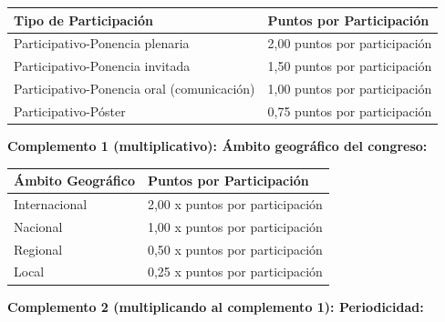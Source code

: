 \documentclass{article}
\begin{document}
\begin{itemize}
\begin{itemize}
\begin{scriptsize}
                  \vspace{0.4cm}
                  \begin{table}[h!]\centering\renewcommand{\arraystretch}{1.3}
                    \begin{tabular}{|p{}|p{}|}\hline
                      Tipo de Participación                      & Puntos por Participación      \\\hline
                      Participativo-Ponencia plenaria            & 2,00 puntos por participación \\\hline
                      Participativo-Ponencia invitada            & 1,50 puntos por participación \\\hline
                      Participativo-Ponencia oral (comunicación) & 1,00 puntos por participación \\\hline
                      Participativo-Póster                       & 0,75 puntos por participación \\\hline
                    \end{tabular}\end{table}
                  \vspace{0.4cm}

                  \textbf{Complemento 1 (multiplicativo): Ámbito geográfico del congreso:}

                  \vspace{0.4cm}
                  \begin{table}[h!]\centering\renewcommand{\arraystretch}{1.3}
                    \begin{tabular}{|p{}|p{}|}\hline
                      Ámbito Geográfico & Puntos por Participación        \\\hline
                      Internacional     & 2,00 x puntos por participación \\\hline
                      Nacional          & 1,00 x puntos por participación \\\hline
                      Regional          & 0,50 x puntos por participación \\\hline
                      Local             & 0,25 x puntos por participación \\\hline
                    \end{tabular}\end{table}
                  \vspace{0.4cm}

                  \textbf{Complemento 2 (multiplicando al complemento 1): Periodicidad:}


\end{scriptsize}
\end{itemize}
\end{itemize}
\end{document}
